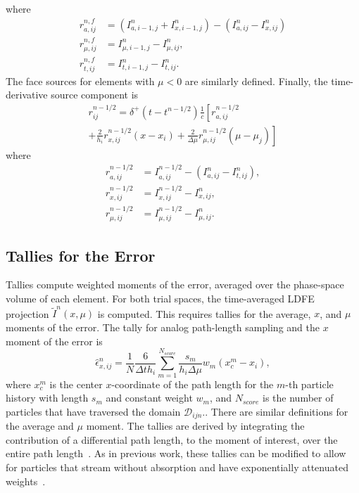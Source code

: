 \documentclass{anstrans}
\begin{document}
where
\begin{align}
    r_{a,ij}^{n,f} &= \left(I_{a,i-1,j}^{n} + I_{x,i-1,j}^n\right) - \left(I_{a,ij}^{n} - I_{x,ij}^n\right)       \\ 
    r_{\mu,ij}^{n,f} &= I_{\mu,i-1,j}^{n} - I_{\mu,ij}^n, \\ 
    r_{t,ij}^{n,f} &= I_{t,i-1,j}^{n} - I_{t,ij}^n.
\end{align}
The face sources for elements with $\mu<0$ are similarly defined.  Finally, the time-derivative
source component is
\begin{multline}
    r_{ij}^{n-1/2} = \delta^+(t-t^{n-1/2})\frac{1}{c}\left[ r_{a,ij}^{n-1/2}  \right. \\ \left. +  \frac{2}{h_i}
    r_{x,ij}^{n-1/2} \left(x - x_i\right) +
    \frac{2}{\Delta \mu}r_{\mu,ij}^{n-1/2}\left(\mu - \mu_j\right)\right] 
\end{multline}
where
\begin{align}
    r_{a,ij}^{n-1/2} &= I_{a,ij}^{n-1/2} - \left(I_{a,ij}^n - I_{t,ij}^n\right), \\
    r_{x,ij}^{n-1/2} &= I_{x,ij}^{n-1/2} - I_{x,ij}^n, \\ 
    r_{\mu,ij}^{n-1/2} &= I_{\mu,ij}^{n-1/2} - I_{\mu,ij}^n.
\end{align}

\subsection{Tallies for the Error}

\label{app:tallies}
Tallies compute weighted moments of the error, averaged over the phase-space volume of each element. 
 For both trial spaces, the time-averaged LDFE projection  $\tilde I^n(x,\mu)$ is computed. 
This requires tallies for the average, $x$, and $\mu$ moments of the
error.  The tally for analog path-length sampling and the $x$ moment of the error is 
\begin{equation}
    {\hat \epsilon}^n_{x,ij} =\frac{1}{N} \frac{6}{\Delta t h_i} \sum_{m=1}^{N_{score}}
    \frac{s_m}{h_{i}\Delta \mu} w_m \left(x^m_c - x_i\right),
\end{equation}
where $x^m_c$ is the center $x$-coordinate of the path length for the $m$-th particle history with
length $s_m$ and constant weight $w_m$, and $N_{score}$ is the number of particles that have traversed the domain
$\mathcal{D}_{ijn}$..  There
are similar definitions for the average and $\mu$ moment.  The tallies are derived by
integrating the contribution of a differential path length, to the moment of interest, over the entire path
length~\cite{dissertation}.  As in previous work, these tallies can be modified to allow for particles that
stream without absorption and have exponentially attenuated weights~\cite{bolding_nse}. 
\end{document}
